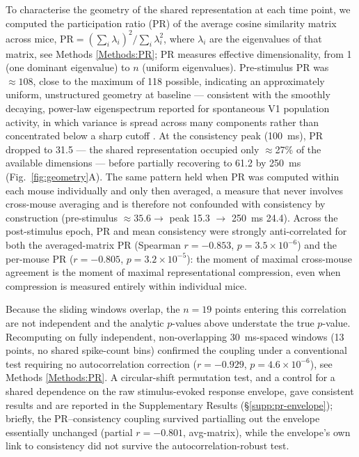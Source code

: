 \documentclass[11pt,onecolumn]{article}
\begin{document}
To characterise the geometry of the shared representation at each time
point, we computed the participation ratio (PR) of the average cosine
similarity matrix across mice,
$\mathrm{PR} = (\sum_i \lambda_i)^2 / \sum_i \lambda_i^2$, where
$\lambda_i$ are the eigenvalues of that matrix, see Methods \ref{Methods:PR}; 
PR measures effective dimensionality, from 1 (one dominant eigenvalue) to $n$
(uniform eigenvalues). Pre-stimulus PR was $\approx 108$, close to the
maximum of 118 possible, indicating an approximately uniform,
unstructured geometry at baseline --- consistent with the smoothly
decaying, power-law eigenspectrum reported for spontaneous V1 population
activity, in which variance is spread across many components rather than
concentrated below a sharp cutoff \citep{stringer2019}. At the consistency 
peak (100~ms), PR dropped to 31.5 --- the shared representation occupied only
$\approx$27\% of the available dimensions --- before partially
recovering to 61.2 by 250~ms (Fig.~\ref{fig:geometry}A). The same pattern
held when PR was computed within each mouse individually and only then
averaged, a measure that never involves cross-mouse averaging and is
therefore not confounded with consistency by construction (pre-stimulus
$\approx 35.6 \to$ peak 15.3 $\to$ 250~ms 24.4). Across the post-stimulus
epoch, PR and mean consistency were strongly anti-correlated for both the
averaged-matrix PR (Spearman $r = -0.853$, $p = 3.5 \times 10^{-6}$) and
the per-mouse PR ($r = -0.805$, $p = 3.2 \times 10^{-5}$): the moment of
maximal cross-mouse agreement is the moment of maximal representational
compression, even when compression is measured entirely within individual
mice.

Because the sliding windows overlap, the $n=19$ points entering this
correlation are not independent and the analytic $p$-values above
understate the true $p$-value. Recomputing on fully independent,
non-overlapping 30~ms-spaced windows (13 points, no shared spike-count
bins) confirmed the coupling under a conventional test requiring no
autocorrelation correction ($r = -0.929$, $p = 4.6 \times 10^{-6}$), 
see Methods \ref{Methods:PR}. A circular-shift permutation test, 
and a control for a shared dependence on
the raw stimulus-evoked response envelope, gave consistent results and are
reported in the Supplementary Results
(\S\ref{supp:pr-envelope}); briefly, the PR--consistency coupling survived
partialling out the envelope essentially unchanged (partial
$r = -0.801$, avg-matrix), while the envelope's own link to consistency
did not survive the autocorrelation-robust test.
\end{document}
